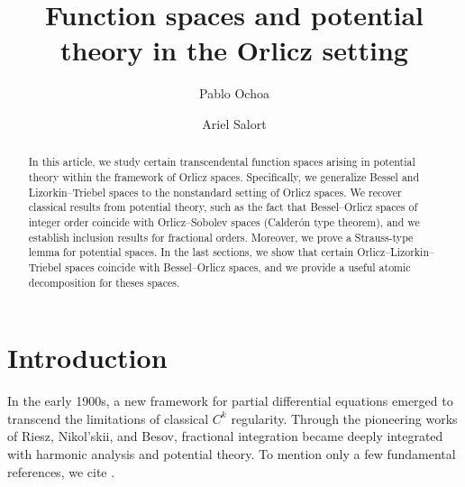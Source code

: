 \documentclass[leqno,twoside, 12pt]{amsart}
\theoremstyle{plain}
\numberwithin{equation}{section} \numberwithin{figure}{section}
\theoremstyle{definition}
\numberwithin{equation}{section}
\begin{document}

\title{Function spaces and potential theory in the Orlicz setting}
 


 

\author{Pablo Ochoa}

\address{P. Ochoa. \newline Universidad Nacional de Cuyo, Fac. de Ingenier\'ia. CONICET. Universidad J. A. Maza\\Parque Gral. San Mart\'in 5500\\
Mendoza, Argentina.}


\author{Ariel Salort}
\address{A. Salort \newline Departamento de Matem\'aticas y Ciencia de Datos, Universidad San Pablo-CEU, CEU Universities, Urbanizaci\'on Montepr\'incipe, 28660 Boadilla del Monte, Madrid, Spain. }

 


\parskip 3pt


\begin{abstract}
In this article, we study certain transcendental function spaces arising in potential theory within the framework of Orlicz spaces. Specifically, we generalize Bessel and Lizorkin–Triebel spaces to the nonstandard setting of Orlicz spaces. We recover classical results from potential theory, such as the fact that Bessel–Orlicz spaces of integer order coincide with Orlicz–Sobolev spaces (Calderón type theorem), and we establish inclusion results for fractional orders. Moreover, we prove a Strauss-type lemma for potential spaces. In the last sections, we  show that certain Orlicz–Lizorkin–Triebel spaces coincide with Bessel–Orlicz spaces, and we provide a useful atomic decomposition for theses spaces. 
\end{abstract}
\maketitle


\section{Introduction}
In the early 1900s, a new framework for partial differential equations emerged to transcend the limitations of classical $C^k$ regularity. Through the pioneering works of Riesz, Nikol’skii, and Besov, fractional integration became deeply integrated with harmonic analysis and potential theory. To mention only a few fundamental references, we cite \cite{AS, D, grafakos, Riesz, St, Triebel}.
\end{document}

